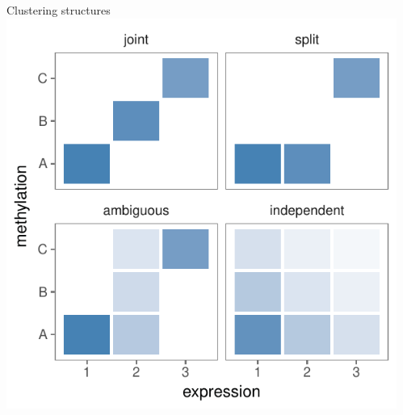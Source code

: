 \documentclass[t, final]{beamer}
\begin{document}
\begin{frame}{}
\begin{columns}[t]
\begin{column}{.32\linewidth}
\begin{block}{Clustering structures}
  \includegraphics[width=\textwidth]{Figures/cdc-example-pi.pdf}
\end{block}

\end{column}


\begin{column}{.32\linewidth}


\end{column}
\end{columns}
\end{frame}
\end{document}
